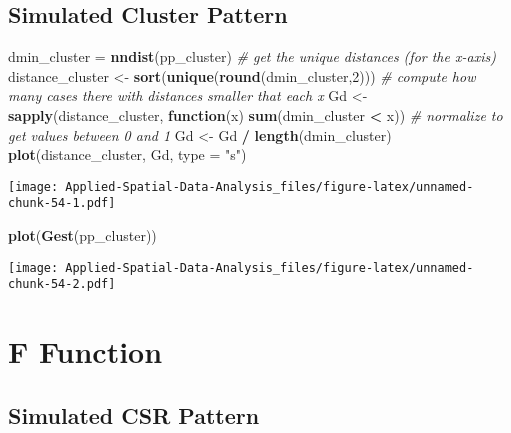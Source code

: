 \documentclass[
]{book}
\newenvironment{Shaded}{\begin{snugshade}}{\end{snugshade}}
\newcommand{\CommentTok}[1]{\textcolor[rgb]{0.56,0.35,0.01}{\textit{#1}}}
\newcommand{\ControlFlowTok}[1]{\textcolor[rgb]{0.13,0.29,0.53}{\textbf{#1}}}
\newcommand{\DataTypeTok}[1]{\textcolor[rgb]{0.13,0.29,0.53}{#1}}
\newcommand{\DecValTok}[1]{\textcolor[rgb]{0.00,0.00,0.81}{#1}}
\newcommand{\KeywordTok}[1]{\textcolor[rgb]{0.13,0.29,0.53}{\textbf{#1}}}
\newcommand{\NormalTok}[1]{#1}
\newcommand{\OperatorTok}[1]{\textcolor[rgb]{0.81,0.36,0.00}{\textbf{#1}}}
\newcommand{\StringTok}[1]{\textcolor[rgb]{0.31,0.60,0.02}{#1}}
\begin{document}
\hypertarget{simulated-cluster-pattern-2}{%
\subsection{Simulated Cluster Pattern}\label{simulated-cluster-pattern-2}}

\begin{Shaded}
\begin{Highlighting}[]
\NormalTok{dmin_cluster =}\StringTok{ }\KeywordTok{nndist}\NormalTok{(pp_cluster)}
\CommentTok{# get the unique distances (for the x-axis)}
\NormalTok{distance_cluster <-}\StringTok{ }\KeywordTok{sort}\NormalTok{(}\KeywordTok{unique}\NormalTok{(}\KeywordTok{round}\NormalTok{(dmin_cluster,}\DecValTok{2}\NormalTok{)))}
\CommentTok{# compute how many cases there with distances smaller that each x}
\NormalTok{Gd <-}\StringTok{ }\KeywordTok{sapply}\NormalTok{(distance_cluster, }\ControlFlowTok{function}\NormalTok{(x) }\KeywordTok{sum}\NormalTok{(dmin_cluster }\OperatorTok{<}\StringTok{ }\NormalTok{x))}
\CommentTok{# normalize to get values between 0 and 1}
\NormalTok{Gd <-}\StringTok{ }\NormalTok{Gd }\OperatorTok{/}\StringTok{ }\KeywordTok{length}\NormalTok{(dmin_cluster)}
\KeywordTok{plot}\NormalTok{(distance_cluster, Gd, }\DataTypeTok{type =} \StringTok{"s"}\NormalTok{)}
\end{Highlighting}
\end{Shaded}

\texttt{[image: Applied-Spatial-Data-Analysis\_files/figure-latex/unnamed-chunk-54-1.pdf]}

\begin{Shaded}
\begin{Highlighting}[]
\KeywordTok{plot}\NormalTok{(}\KeywordTok{Gest}\NormalTok{(pp_cluster))}
\end{Highlighting}
\end{Shaded}

\texttt{[image: Applied-Spatial-Data-Analysis\_files/figure-latex/unnamed-chunk-54-2.pdf]}

\hypertarget{f-function}{%
\section{F Function}\label{f-function}}

\hypertarget{simulated-csr-pattern-3}{%
\subsection{Simulated CSR Pattern}\label{simulated-csr-pattern-3}}
\end{document}
